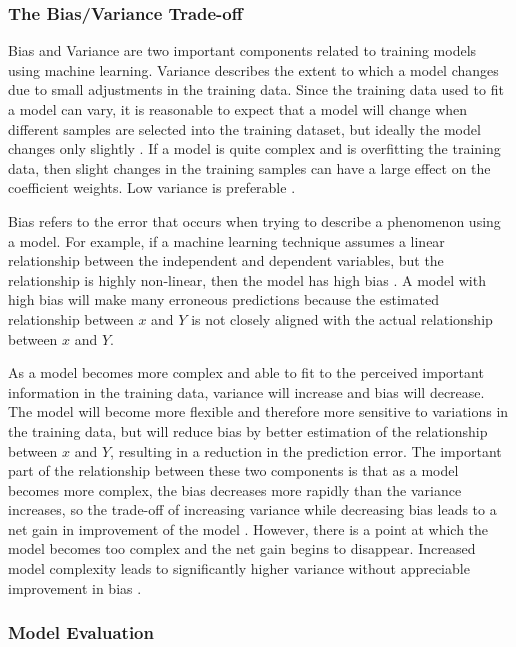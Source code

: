 \documentclass[sigconf]{acmart}
\begin{document}
\subsubsection{The Bias/Variance Trade-off}

Bias and Variance are two important components related to training models using machine learning. Variance describes the extent to which a model changes due to small adjustments in the training data. Since the training data used to fit a model can vary, it is reasonable to expect that a model will change when different samples are selected into the training dataset, but ideally the model changes only slightly \cite{cite03}. If a model is quite complex and is overfitting the training data, then slight changes in the training samples can have a large effect on the coefficient weights. Low variance is preferable \cite{cite03}.

Bias refers to the error that occurs when trying to describe a phenomenon using a model. For example, if a machine learning technique assumes a linear relationship between the independent and dependent variables, but the relationship is highly non-linear, then the model has high bias \cite{cite03}. A model with high bias will make many erroneous predictions because the estimated relationship between \(x\) and \(Y\) is not closely aligned with the actual relationship between \(x\) and \(Y\).

As a model becomes more complex and able to fit to the perceived important information in the training data, variance will increase and bias will decrease. The model will become more flexible and therefore more sensitive to variations in the training data, but will reduce bias by better estimation of the relationship between \(x\) and \(Y\), resulting in a reduction in the prediction error. The important part of the relationship between these two components is that as a model becomes more complex, the bias decreases more rapidly than the variance increases, so the trade-off of increasing variance while decreasing bias leads to a net gain in improvement of the model \cite{cite03}. However, there is a point at which the model becomes too complex and the net gain begins to disappear. Increased model complexity leads to significantly higher variance without appreciable improvement in bias \cite{cite03}. 

\subsubsection{Model Evaluation}
\end{document}
